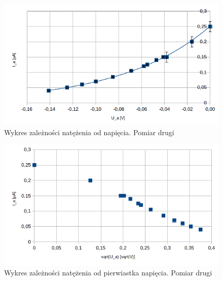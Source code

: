 \documentclass[a4paper]{article}
\begin{document}
\begin{figure}[h!]
	\includegraphics[scale=1]{T2_Ia_U}
	\centering
	\caption{Wykres zależności natężenia od napięcia. Pomiar drugi}
\end{figure}

\begin{figure}[h!]
	\includegraphics[scale=1]{T2_Ia_sqrtU}
	\centering
	\caption{Wykres zależności natężenia od pierwiastka napięcia. Pomiar drugi}
\end{figure}
\end{document}
